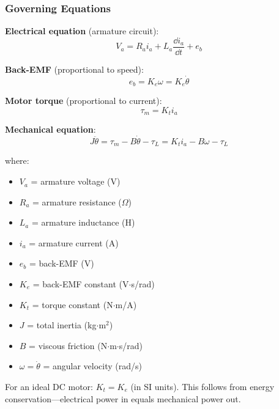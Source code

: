 

\subsubsection{Governing Equations}

\textbf{Electrical equation} (armature circuit):
\begin{equation}
V_a = R_a i_a + L_a\frac{\dd i_a}{\dd t} + e_b
\end{equation}

\textbf{Back-EMF} (proportional to speed):
\begin{equation}
e_b = K_e \omega = K_e \dot{\theta}
\end{equation}

\textbf{Motor torque} (proportional to current):
\begin{equation}
\tau_m = K_t i_a
\end{equation}

\textbf{Mechanical equation}:
\begin{equation}
J\ddot{\theta} = \tau_m - B\dot{\theta} - \tau_L = K_t i_a - B\omega - \tau_L
\end{equation}

where:
\begin{itemize}
    \item $V_a$ = armature voltage (V)
    \item $R_a$ = armature resistance ($\Omega$)
    \item $L_a$ = armature inductance (H)
    \item $i_a$ = armature current (A)
    \item $e_b$ = back-EMF (V)
    \item $K_e$ = back-EMF constant (V$\cdot$s/rad)
    \item $K_t$ = torque constant (N$\cdot$m/A)
    \item $J$ = total inertia (kg$\cdot$m$^2$)
    \item $B$ = viscous friction (N$\cdot$m$\cdot$s/rad)
    \item $\omega = \dot{\theta}$ = angular velocity (rad/s)
\end{itemize}

\begin{keyconceptbox}[title=Motor Constants]
For an ideal DC motor: $K_t = K_e$ (in SI units). This follows from energy conservation---electrical power in equals mechanical power out.
\end{keyconceptbox}

